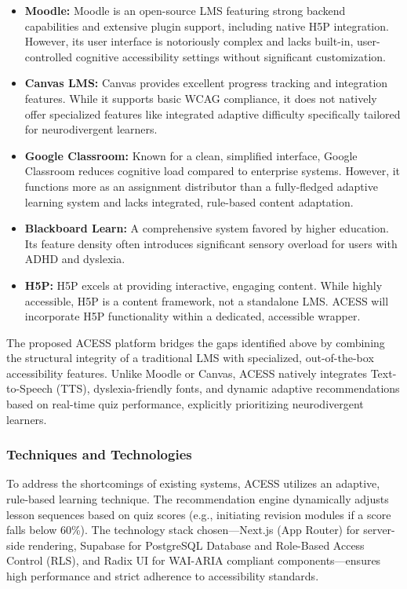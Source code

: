 \documentclass[12pt,a4paper]{report}
\begin{document}
\begin{itemize}[itemsep=-1mm]
\item \textbf{Moodle:} Moodle is an open-source LMS featuring strong backend capabilities and extensive plugin support, including native H5P integration. However, its user interface is notoriously complex and lacks built-in, user-controlled cognitive accessibility settings without significant customization. 
\item \textbf{Canvas LMS:} Canvas provides excellent progress tracking and integration features. While it supports basic WCAG compliance, it does not natively offer specialized features like integrated adaptive difficulty specifically tailored for neurodivergent learners.
\item \textbf{Google Classroom:} Known for a clean, simplified interface, Google Classroom reduces cognitive load compared to enterprise systems. However, it functions more as an assignment distributor than a fully-fledged adaptive learning system and lacks integrated, rule-based content adaptation.
\item \textbf{Blackboard Learn:} A comprehensive system favored by higher education. Its feature density often introduces significant sensory overload for users with ADHD and dyslexia.
\item \textbf{H5P:} H5P excels at providing interactive, engaging content. While highly accessible, H5P is a content framework, not a standalone LMS. ACESS will incorporate H5P functionality within a dedicated, accessible wrapper.
\end{itemize}

The proposed ACESS platform bridges the gaps identified above by combining the structural integrity of a traditional LMS with specialized, out-of-the-box accessibility features. Unlike Moodle or Canvas, ACESS natively integrates Text-to-Speech (TTS), dyslexia-friendly fonts, and dynamic adaptive recommendations based on real-time quiz performance, explicitly prioritizing neurodivergent learners.

\subsubsection{Techniques and Technologies}
To address the shortcomings of existing systems, ACESS utilizes an adaptive, rule-based learning technique. The recommendation engine dynamically adjusts lesson sequences based on quiz scores (e.g., initiating revision modules if a score falls below 60\%). The technology stack chosen—Next.js (App Router) for server-side rendering, Supabase for PostgreSQL Database and Role-Based Access Control (RLS), and Radix UI for WAI-ARIA compliant components—ensures high performance and strict adherence to accessibility standards.
\end{document}
